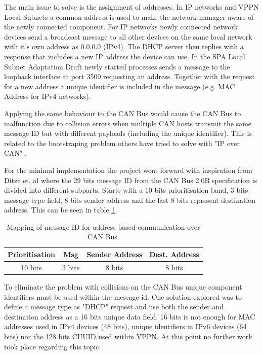 The main issue to solve is the assignment of addresses. In IP networks and VPPN Local
Subnets a common address is used to make the network manager aware of the newly
connected component. For IP networks newly connected network devices send a
broadcast message to all other devices on the same local network with it's own
address as 0.0.0.0 (IPv4). The DHCP server then replies with a response that
includes a new IP address the device can use. In the SPA Local Subnet
Adaptation Draft newly started processes sends a message to the loopback
interface at port 3500 requesting an address. Together with the request for a
new address a unique identifier is included in the message (e.g. MAC Address
for IPv4 networks).

Applying the same behaviour to the CAN Bus would cause the CAN Bus to
malfunction due to collision errors when multiple CAN hosts transmit the same
message ID but with different payloads (including the unique identifier).
This is related to the bootstraping problem others have tried to solve with
"IP over CAN" \cite{web:draft-ip_over_can, web:porting_ip_can}.

For the minimal implementation the project went forward with inspiration from
Ditze et. al \cite{web:porting_ip_can} where the 29 bits message ID from the
CAN Bus 2.0B specification is divided into different subparts. Starts with a 10
bits prioritisation band, 3 bits message type field, 8 bits sender address and
the last 8 bits represent destination address. This can be seen in table
\ref{table:mapping_message_id_to_ip}.

\begin{table}
\centering
    \caption{Mapping of message ID for address based communication over CAN
    Bus.}
    \begin{tabular}{|c|c|c|c|} \hline
    \label{table:mapping_message_id_to_ip}
    Prioritisation & Msg & Sender Address & Dest. Address  \\ \hline
            10 bits & 3 bits & 8 bits & 8 bits \\ \hline
    \end{tabular}
\end{table}

To eliminate the problem with collisions on the CAN Bus unique component
identifiers must be used within the message id. One solution explored was to
define a message type as "DHCP" request and use both the sender and destination
address as a 16 bits unique data field. 16 bits is not enough for MAC addresses
used in IPv4 devices (48 bits), unique identifiers in IPv6 devices (64 bits)
nor the 128 bits CUUID used within VPPN. At this point no further work took
place regarding this topic.

